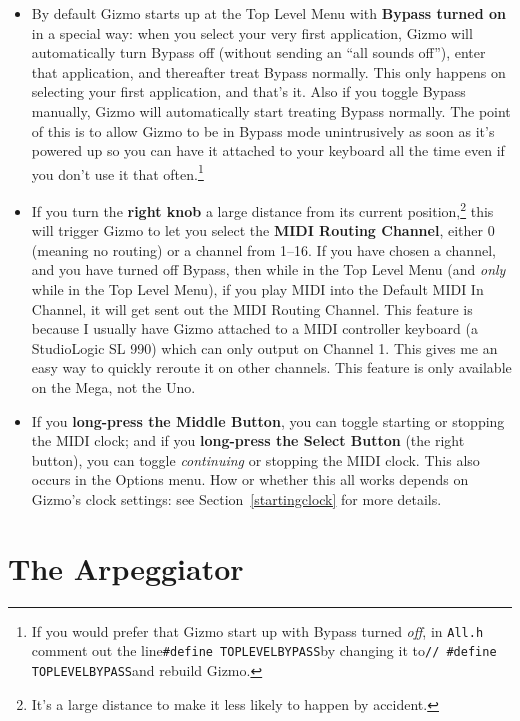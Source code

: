 \documentclass{article}
\begin{document}
\begin{itemize}
\item By default Gizmo starts up at the Top Level Menu with {\bf Bypass turned on} in a special way: when you select your very first application, Gizmo will automatically turn Bypass off (without sending an ``all sounds off''), enter that application, and thereafter treat Bypass normally.  This only happens on selecting your first application, and that's it.  Also if you toggle Bypass manually, Gizmo will automatically start treating Bypass normally.  The point of this is to allow Gizmo to be in Bypass mode unintrusively as soon as it's powered up so you can have it attached to your keyboard all the time even if you don't use it that often.\footnote{If you would prefer that Gizmo start up with Bypass turned {\it off}, in \texttt{All.h} comment out the line\quad\texttt{\#define TOPLEVEL{\textunderscore}BYPASS}\quad by changing it to\quad\texttt{// \#define TOPLEVEL{\textunderscore}BYPASS}\quad and rebuild Gizmo.}

\item If you turn the {\bf right knob} a large distance from its current position,\footnote{It's a large distance to make it less likely to happen by accident.}  this will trigger Gizmo to let you select the {\bf  MIDI Routing Channel}, either 0 (meaning no routing) or a channel from 1--16.  If you have chosen a channel, and you have turned off Bypass, then while in the Top Level Menu (and {\it only} while in the Top Level Menu), if you play MIDI into the Default MIDI In Channel, it will get sent out the MIDI Routing Channel.  This feature is because I usually have Gizmo attached to a MIDI controller keyboard (a StudioLogic SL 990) which can only output on Channel 1.  This gives me an easy way to quickly reroute it on other channels.    This feature is only available on the Mega, not the Uno.

\item If you {\bf long-press the Middle Button}, you can toggle starting or stopping the MIDI clock; and if you {\bf long-press the Select Button} (the right button), you can toggle {\it continuing} or stopping the MIDI clock.  This also occurs in the Options menu.  How or whether this all works depends on Gizmo's clock settings: see Section~\ref{startingclock} for more details.
\end{itemize}


\clearpage
\section {The Arpeggiator}
\end{document}
